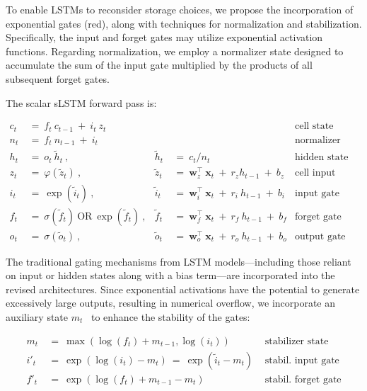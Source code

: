 To enable LSTMs to reconsider storage choices, we propose the incorporation of exponential gates (red), along with techniques for normalization and stabilization. Specifically, the input and forget gates may utilize exponential activation functions. Regarding normalization, we employ a normalizer state designed to accumulate the sum of the input gate multiplied by the products of all subsequent forget gates.

The scalar sLSTM forward pass is:

\begin{align}
\label{eq:slstmforward}
c_t \ &= \  f_t \ c_{t-1} \ + \ i_t \ z_t & & 
 &\text{cell state} \\
n_t \ &= \  f_t \ n_{t-1} \ + \ i_t  & & 
 &\text{normalizer state} \\
h_t \ &= \ o_t \ \tilde{h}_t \ ,
  &\tilde{h}_t \ &= \ c_t / n_t
&\text{hidden state} \\
z_t \ &= \ \varphi \left( \tilde{z}_t \right) \ , 
  &\tilde{z}_t \ &=  \ \mathbf{w}^\top_{z} \ \mathbf{x}_t \ + \
  r_{z}  h_{t-1} \ + \  b_{z}
  &\text{cell input} \\
i_t \ &= \ \!\exp \left( \tilde{i}_t  \right) \ , 
  &\tilde{i}_t \ &= \ \mathbf{w}^\top_{i} \ \mathbf{x}_t \ + \
  r_{i}  \ h_{t-1} \ + \  b_{i}
  &\text{input gate} \\
f_t \ &= \ \sigma \left(  \tilde{f}_t \right) \ \text{OR} \
\!\exp \left(  \tilde{f}_t \right) \ ,
  &\tilde{f}_t \ &= \ \mathbf{w}^\top_{f} \ \mathbf{x}_t  \ + \
  r_{f}  \ h_{t-1} \ + \  b_{f}
  &\text{forget gate} \\
o_t \ &= \ \sigma \left( \tilde{o}_t \right) \ , 
  &\tilde{o}_t  \ &= \ \mathbf{w}^\top_{o} \ \mathbf{x}_t \ + \
  r_{o}  \ h_{t-1} \ + \  b_{o}
  &\text{output gate} 
\end{align}

The traditional gating mechanisms from LSTM models—including those reliant on input or hidden states along with a bias term—are incorporated into the revised architectures. Since exponential activations have the potential to generate excessively large outputs, resulting in numerical overflow, we incorporate an auxiliary state \mbox{$m_t$~\citep{Milakov:18arxiv}} to enhance the stability of the gates:

\begin{align}
\label{eq:slstmstabil}
m_t \ &= \ \max \left( \log ( f_t ) + m_{t-1} , \log ( i_t ) \right) &\text{stabilizer state} \\
i'_t \ &= \ \!\exp \left( \log \left( i_t \right) - m_t \right) \ = \ \!\exp \left( \tilde{i}_t - m_t \right) \ \, 
  &\text{stabil. input gate} \\
f'_t \ &= \ \!\exp \left( \log \left( f_t \right) + m_{t-1} - m_t \right) \ \, 
  &\text{stabil. forget gate}
\end{align}

